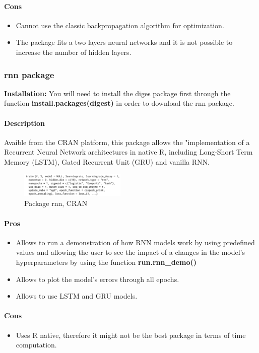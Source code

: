\documentclass[letter]{article}\usepackage[]{graphicx}\usepackage[]{color}
\begin{document}
\paragraph{Cons}
\begin{itemize}
\item Cannot use the classic backpropagation algorithm for optimization.
\item The package fits a two layers neural networks and it is not possible to increase the number of hidden layers.
\end{itemize}

\subsubsection{rnn package}
\textbf{Installation:} You will need to install the diges package first through the function \textbf{install.packages(digest)} in order to download the rnn package.
\paragraph{Description}
Avaible from the CRAN platform, this package allows the "implementation of a Recurrent Neural Network architectures in native R, including Long-Short Term Memory (LSTM), Gated Recurrent Unit (GRU) and vanilla RNN. 
\begin{figure}[h]
    \centering
    \includegraphics[width=0.45\textwidth]{figure/rnn_package.png}
     \caption{Package rnn, CRAN}
\end{figure}
\paragraph{Pros}
\begin{itemize}
\item Allows to run a demonstration of how RNN models work by using predefined values and allowing the user to see the impact of a changes in the model's hyperparameters by using the function \textbf{run.rnn\_demo()}
\item Allows to plot the model's errors through all epochs.
\item Allows to use LSTM and GRU models.
\end{itemize}
\paragraph{Cons}
\begin{itemize}
\item Uses R native, therefore it might not be the best package in terms of time computation.
\end{itemize}
\end{document}
